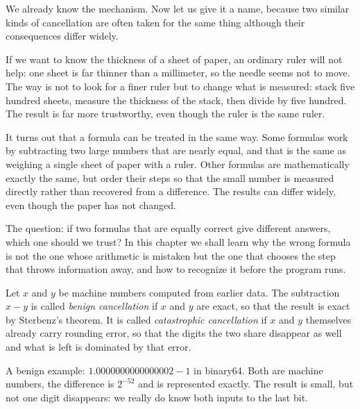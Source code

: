 We already know the mechanism. Now let us give it a name, because two similar kinds of
cancellation are often taken for the same thing although their consequences differ
widely.

\begin{untukanak}
If we want to know the thickness of a sheet of paper, an ordinary ruler will not help:
one sheet is far thinner than a millimeter, so the needle seems not to move. The way is
not to look for a finer ruler but to change what is measured: stack five hundred sheets,
measure the thickness of the stack, then divide by five hundred. The result is far more
trustworthy, even though the ruler is the same ruler.

It turns out that a formula can be treated in the same way. Some formulas work by
subtracting two large numbers that are nearly equal, and that is the same as weighing a
single sheet of paper with a ruler. Other formulas are mathematically exactly the same,
but order their steps so that the small number is measured directly rather than
recovered from a difference. The results can differ widely, even though the paper has
not changed.

The question: if two formulas that are equally correct give different answers, which
one should we trust? In this chapter we shall learn why the wrong formula is not the one
whose arithmetic is mistaken but the one that chooses the step that throws information
away, and how to recognize it before the program runs.
\end{untukanak}


\begin{definisi}
Let $x$ and $y$ be machine numbers computed from earlier data.
The subtraction $x-y$ is called \emph{benign cancellation} if $x$ and $y$ are exact, so
that the result is exact by Sterbenz's theorem. It is called \emph{catastrophic
cancellation} if $x$ and $y$ themselves already carry rounding error, so that the digits
the two share disappear as well and what is left is dominated by that error.
\end{definisi}

A benign example: $1.0000000000000002-1$ in binary64. Both are machine numbers, the
difference is $2^{-52}$ and is represented exactly. The result is small, but not one
digit disappears: we really do know both inputs to the last bit.

